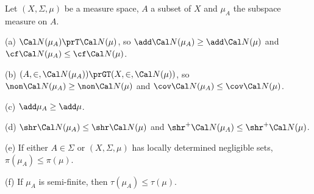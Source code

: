  Let $(X,\Sigma,\mu)$ be a measure space,
$A$ a subset of $X$ and $\mu_A$ the subspace measure on $A$.

(a) $\Cal N(\mu_A)\prT\Cal N(\mu)$, so
$\add\Cal N(\mu_A)\ge\add\Cal N(\mu)$ and
$\cf\Cal N(\mu_A)\le\cf\Cal N(\mu)$.

(b) $(A,\in,\penalty-100\Cal N(\mu_A))\prGT(X,\in,\Cal N(\mu))$, so
$\non\Cal N(\mu_A)\ge\non\Cal N(\mu)$ and
$\cov\Cal N(\mu_A)\le\cov\Cal N(\mu)$.

(c) $\add\mu_A\ge\add\mu$.

(d) $\shr\Cal N(\mu_A)\le\shr\Cal N(\mu)$
and $\shr^+\Cal N(\mu_A)\le\shr^+\Cal N(\mu)$.

(e) If either $A\in\Sigma$ or $(X,\Sigma,\mu)$
has locally determined negligible sets, $\pi(\mu_A)\le\pi(\mu)$.

(f) If $\mu_A$ is semi-finite, then
$\tau(\mu_A)\le\tau(\mu)$.

